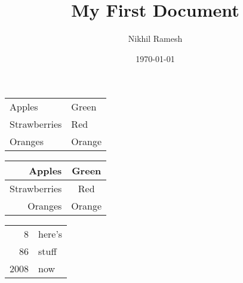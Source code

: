 \documentclass[a4paper,12pt]{article}
\begin{document}
\title{My First Document}
\author{Nikhil Ramesh}
\date{\today}
\maketitle





\begin{tabular}{|l|l|}
Apples & Green 
\\Strawberries & Red 
\\Oranges & Orange 
\\\end{tabular}

\newpage

\begin{tabular}{rc}
Apples & Green \\
\hline
Strawberries & Red \\
\cline{1-1}
Oranges & Orange \\
\end{tabular}

\newpage

\begin{tabular}{|r|l|}
\hline
8 & here’s \\
\cline{2-2}
86 & stuff \\
\hline \hline
2008 & now \\
\hline
\end{tabular}


\newpage
\end{document}
